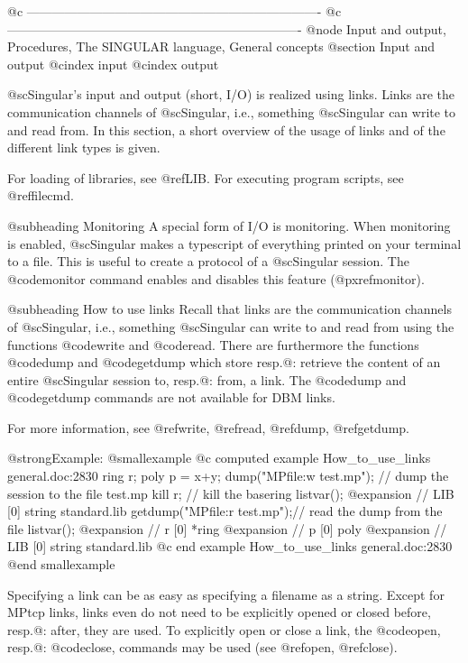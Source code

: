 {{{@c ----------------------------------------------------------------------
@c ----------------------------------------------------------------------
@node Input and output, Procedures, The SINGULAR language, General concepts
@section Input and output
@cindex input
@cindex output

@sc{Singular}'s input and output (short, I/O) is realized using links.
Links are the communication channels of @sc{Singular}, i.e., something
@sc{Singular} can write to and read from.  In this section, a short
overview of the usage of links and of the different link types is given.

For loading of libraries, see @ref{LIB}. For executing program scripts,
see @ref{filecmd}.

@subheading Monitoring
A special form of I/O is monitoring.  When monitoring is enabled,
@sc{Singular} makes a typescript of everything printed on your terminal
to a file.  This is
useful to create a protocol of a @sc{Singular} session.  The
@code{monitor} command enables and disables this feature
(@pxref{monitor}).


@subheading How to use links
Recall that links are the communication channels of @sc{Singular}, i.e.,
something @sc{Singular} can write to and read from using the functions
@code{write} and @code{read}. There are furthermore
the functions @code{dump} and @code{getdump} which store resp.@:
retrieve the content of an entire @sc{Singular} session to, resp.@: from,
a link.  The @code{dump} and @code{getdump} commands are not available
for DBM links.

For more information, see @ref{write}, @ref{read}, @ref{dump},
@ref{getdump}.

@strong{Example:}
@smallexample
@c computed example How_to_use_links general.doc:2830 
  ring r; poly p = x+y;
  dump("MPfile:w test.mp");   // dump the session to the file test.mp
  kill r;                     // kill the basering
  listvar();
@expansion{} // LIB                  [0]  string standard.lib
  getdump("MPfile:r test.mp");// read the dump from the file
  listvar();
@expansion{} // r                    [0]  *ring
@expansion{} //      p                    [0]  poly
@expansion{} // LIB                  [0]  string standard.lib
@c end example How_to_use_links general.doc:2830
@end smallexample

Specifying a link can be as easy as specifying a filename as a string.
Except for MPtcp links, links even do not need to be explicitly opened
or closed before, resp.@: after, they are used.  To explicitly open or
close a link, the @code{open}, resp.@: @code{close}, commands may be
used (see @ref{open}, @ref{close}).

}}}
